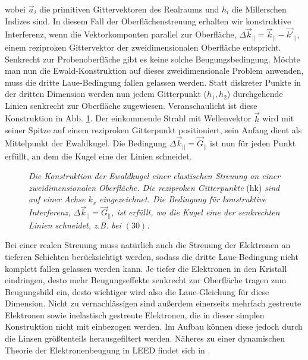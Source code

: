 wobei $\vec{a}_i$ die primitiven Gittervektoren des Realraums und $h_i$ die Millerschen Indizes
sind. In diesem Fall der Oberflächenstreuung erhalten wir konstruktive Interferenz,
wenn die Vektorkomponten parallel zur Oberfläche, $\Delta\vec{k}_{||}=\vec{k}_{||}-\vec{k'}_{||}$,
einem reziproken Gittervektor der zweidimensionalen Oberfläche entspricht. Senkrecht zur Probenoberfläche
gibt es keine solche Beugungsbedingung. Möchte man nun die Ewald-Konstruktion auf dieses
zweidimensionale Problem anwenden, muss die dritte Laue-Bedingung fallen gelassen werden. Statt
diskreter Punkte in der dritten Dimension werden nun jedem Gitterpunkt ($h_1, h_2$) durchgehende
Linien senkrecht zur Oberfläche zugewiesen. Veranschaulicht ist diese Konstruktion in Abb.
\ref{ewald}. Der einkommende Strahl mit Wellenvektor $\vec{k}$ wird mit seiner Spitze auf einem
reziproken Gitterpunkt positioniert, sein Anfang dient als Mittelpunkt der Ewaldkugel. Die
Bedingung $\Delta \vec{k}_{||}=\vec{G}_{||}$ ist nun für jeden Punkt erfüllt, an dem die Kugel eine
der Linien schneidet. 
\begin{figure}[H]
\centering

\caption{\textit{Die Konstruktion der Ewaldkugel einer elastischen Streuung an einer
zweidimensionalen Oberfläche. Die reziproken Gitterpunkte} (hk) \textit{sind auf einer Achse $k_x$
eingezeichnet. Die Bedingung für konstruktive Interferenz, $\Delta \vec{k}_{||}=\vec{G}_{||}$,  ist erfüllt, wo die Kugel eine der senkrechten Linien
schneidet, z.B. bei $(30)$. }}
\label{ewald}
\end{figure}




Bei einer realen Streuung muss natürlich auch die Streuung der Elektronen an tieferen
Schichten berücksichtigt werden, sodass die dritte Laue-Bedingung nicht komplett fallen gelassen werden
kann. Je tiefer die Elektronen in den Kristall eindringen, desto mehr Beugungseffekte senkrecht zur
Oberfläche tragen zum Beugungsbild ein, desto wichtiger wird also die Laue-Gleichung für diese
Dimension. Nicht zu vernachlässigen sind außerdem einerseits mehrfach gestreute Elektronen sowie
inelastisch gestreute Elektronen, die in dieser simplen Konstruktion nicht mit einbezogen werden. Im
Aufbau können diese jedoch durch die Linsen größtenteils herausgefiltert werden. Näheres zu einer dynamischen
Theorie der Elektronenbeugung in LEED findet sich in \cite{Lueth}.

\FloatBarrier










